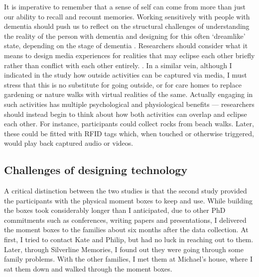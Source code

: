 It is imperative to remember that a sense of self can come from more than just our ability to recall and recount memories. Working sensitively with people with dementia should push us to reflect on the structural challenges of understanding the reality of the person with dementia and designing for this often `dreamlike' state, depending on the stage of dementia \citep{bryden_before_2015}. Researchers should consider what it means to design media experiences for realities that may eclipse each other briefly rather than conflict with each other entirely. . In a similar vein, although I indicated in the study how outside activities can be captured via media, I must stress that this is no substitute for going outside, or for care homes to replace gardening or nature walks with virtual realities of the same. Actually engaging in such activities has multiple psychological and physiological benefits \citep{gilliard_transforming_2011} — researchers should instead begin to think about how both activities can overlap and eclipse each other. For instance, participants could collect rocks from beach walks. Later, these could be fitted with RFID tags which, when touched or otherwise triggered, would play back captured audio or videos.

\subsection{Challenges of designing technology}
\label{robust-tech}
A critical distinction between the two studies is that the second study provided the participants with the physical moment boxes to keep and use. While building the boxes took considerably longer than I anticipated, due to other PhD commitments such as conferences, writing papers and presentations, I delivered the moment boxes to the families about six months after the data collection. At first, I tried to contact Kate and Philip, but had no luck in reaching out to them. Later, through Silverline Memories, I found out they were going through some family problems. With the other families, I met them at Michael's house, where I sat them down and walked through the moment boxes.

